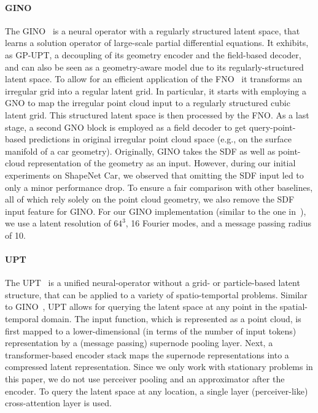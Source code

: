 \paragraph{GINO} The \ac{GINO}~\citep{Li:23} is a neural operator with a regularly structured latent space, that learns a solution operator of large-scale partial differential equations.
It exhibits, as \ac{GP-UPT}, a decoupling of its geometry encoder and the field-based decoder, and can also be seen as a geometry-aware model due to its regularly-structured latent space.
To allow for an efficient application of the \ac{FNO}~\cite{Li:20} it transforms an irregular grid into a regular latent grid.
In particular, it starts with employing a \acf{GNO} to map the irregular point cloud input to a regularly structured cubic latent grid.
This structured latent space is then processed by the \ac{FNO}. 
As a last stage, a second \ac{GNO} block is employed as a field decoder to get query-point-based predictions in original irregular point cloud space
(e.g., on the surface manifold of a car geometry).
Originally, \ac{GINO} takes the \acl{SDF} as well as point-cloud representation of the geometry as an input. 
However, during our initial experiments on ShapeNet Car, we observed that omitting the \ac{SDF} input led to only a minor performance drop. 
To ensure a fair comparison with other baselines, all of which rely solely on the point cloud geometry, we also remove the \ac{SDF} input feature for GINO.
For our \ac{GINO} implementation (similar to the one in~\cite{alkin2024universal}), we use a latent resolution of $64^3$, 16 Fourier modes, and a message passing radius of 10.

\paragraph{UPT} The \acf{UPT}~\cite{alkin2024universal} is a unified neural-operator without a grid- or particle-based latent structure, that can be applied to a variety of spatio-temportal problems. 
Similar to \ac{GINO}~\cite{Li:23}, \ac{UPT} allows for querying the latent space at any point in the spatial-temporal domain.
The input function, which is represented as a point cloud, is first mapped to a lower-dimensional (in terms of the number of input tokens)  representation by a (message passing) supernode pooling layer.
Next, a transformer-based encoder stack maps the supernode representations into a compressed latent representation.
Since we only work with stationary problems in this paper, we do not use perceiver pooling and an approximator after the encoder.
To query the latent space at any location, a single layer (perceiver-like) cross-attention layer is used.

